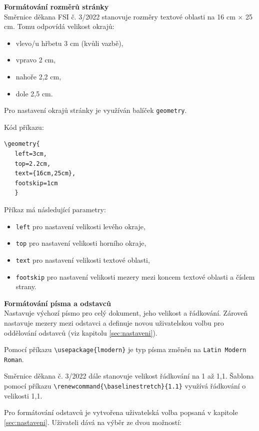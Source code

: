 \textbf{Formátování rozměrů stránky}\\
Směrnice děkana FSI č. 3/2022 stanovuje rozměry textové oblasti na 16 cm $\times$ 25 cm. Tomu odpovídá velikost okrajů:

\begin{itemize}[label=-]
	\item vlevo/u hřbetu 3 cm (kvůli vazbě),
	\item vpravo 2 cm,
	\item nahoře 2,2 cm,
	\item dole 2,5 cm.
\end{itemize}

Pro nastavení okrajů stránky je využíván balíček \verb|geometry|.

Kód příkazu:

\begin{verbatim}
\geometry{
   left=3cm,
   top=2.2cm,
   text={16cm,25cm},
   footskip=1cm
   }
\end{verbatim} 

Příkaz má následující parametry:

\begin{itemize}[label=-]
	\item \verb|left| pro nastavení velikosti levého okraje,
	\item \verb|top| pro nastavení velikosti horního okraje,
	\item \verb|text| pro nastavení velikosti textové oblasti,
	\item \verb|footskip| pro nastavení velikosti mezery mezi koncem textové oblasti a číslem strany.
\end{itemize}

\vspace{8pt}

\textbf{Formátování písma a odstavců}\\
Nastavuje výchozí písmo pro celý dokument, jeho velikost a řádkování. Zároveň nastavuje mezery mezi odstavci a definuje novou uživatelskou volbu pro oddělování odstavců (viz kapitolu \ref{sec:nastaveni}).

Pomocí příkazu \verb|\usepackage{lmodern}| je typ písma změněn na \verb|Latin Modern Roman|.

Směrnice děkana č. 3/2022 dále stanovuje velikost řádkování na 1 až 1,1. Šablona pomocí příkazu \verb|\renewcommand{\baselinestretch}{1.1}| využívá řádkování o velikosti 1,1.

Pro formátování odstavců je vytvořena uživatelská volba popsaná v kapitole \ref{sec:nastaveni}. Uživateli dává na výběr ze dvou možností:

